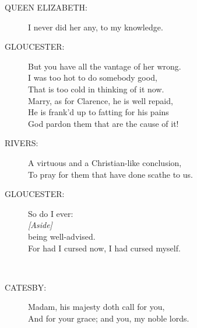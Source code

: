 \documentclass{article}
\begin{document}
\begin{description}
\item[QUEEN ELIZABETH:] 
\hspace{1pt}I never did her any, to my knowledge.\\
\end{description}
\begin{description}
\item[GLOUCESTER:] 
\hspace{1pt}But you have all the vantage of her wrong.\\
\hspace{1pt}I was too hot to do somebody good,\\
\hspace{1pt}That is too cold in thinking of it now.\\
\hspace{1pt}Marry, as for Clarence, he is well repaid,\\
\hspace{1pt}He is frank'd up to fatting for his pains\\
\hspace{1pt}God pardon them that are the cause of it!\\
\end{description}
\begin{description}
\item[RIVERS:] 
\hspace{1pt}A virtuous and a Christian-like conclusion,\\
\hspace{1pt}To pray for them that have done scathe to us.\\
\end{description}
\begin{description}
\item[GLOUCESTER:] 
\hspace{1pt}So do I ever:\\
{\it [Aside]}\\
\hspace{1pt}being well-advised.\\
\hspace{1pt}For had I cursed now, I had cursed myself.\\
\end{description}
\\
\begin{description}
\item[CATESBY:] 
\hspace{1pt}Madam, his majesty doth call for you,\\
\hspace{1pt}And for your grace; and you, my noble lords.\\
\end{description}
\end{document}
